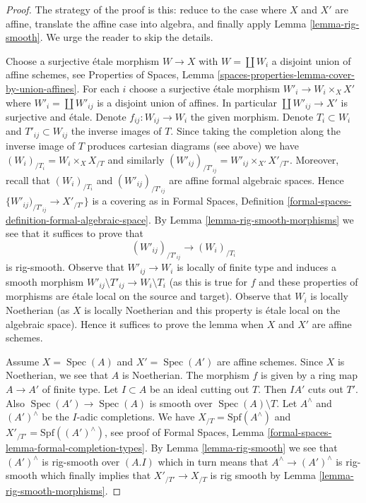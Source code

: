 \documentclass[10pt,a4paper]{amsart}
\theoremstyle{plain}
\theoremstyle{definition}
\theoremstyle{remark}
\numberwithin{equation}{subsection}
\def\Spec{\mathop{\mathrm{Spec}}}
\begin{document}
\begin{proof}
The strategy of the proof is this: reduce to the case where $X$ and $X'$
are affine, translate the affine case into algebra, and finally apply
Lemma \ref{lemma-rig-smooth}. We urge the reader to skip the details.

\medskip\noindent
Choose a surjective \'etale morphism $W \to X$ with $W = \coprod W_i$
a disjoint union of affine schemes, see Properties of Spaces, Lemma
\ref{spaces-properties-lemma-cover-by-union-affines}.
For each $i$ choose a surjective \'etale morphism $W'_i \to W_i \times_X X'$
where $W'_i = \coprod W'_{ij}$ is a disjoint union of affines.
In particular $\coprod W'_{ij} \to X'$ is surjective and \'etale.
Denote $f_{ij} : W_{ij} \to W_i$ the given morphism.
Denote $T_i \subset W_i$ and $T'_{ij} \subset W_{ij}$ the inverse
images of $T$. Since taking the completion along the inverse
image of $T$ produces cartesian diagrams (see above) we
have $(W_i)_{/T_i} = W_i \times_X X_{/T}$ and similarly
$(W'_{ij})_{/T'_{ij}} = W'_{ij} \times_{X'} X'_{/T'}$.
Moreover, recall that $(W_i)_{/T_i}$ and $(W'_{ij})_{/T'_{ij}}$
are affine formal algebraic spaces.
Hence $\{W'_{ij})_{/T'_{ij}} \to X'_{/T'}\}$ is a covering
as in Formal Spaces, Definition
\ref{formal-spaces-definition-formal-algebraic-space}.
By Lemma \ref{lemma-rig-smooth-morphisms}
we see that it suffices to prove that
$$
(W'_{ij})_{/T'_{ij}} \longrightarrow (W_i)_{/T_i}
$$
is rig-smooth. Observe that $W'_{ij} \to W_i$
is locally of finite type and induces a smooth morphism
$W'_{ij} \setminus T'_{ij} \to W_i \setminus T_i$
(as this is true for $f$ and these properties of morphisms are
\'etale local on the source and target).
Observe that $W_i$ is locally Noetherian (as $X$ is locally Noetherian
and this property is \'etale local on the algebraic space).
Hence it suffices to prove the lemma when
$X$ and $X'$ are affine schemes.

\medskip\noindent
Assume $X = \Spec(A)$ and $X' = \Spec(A')$ are affine schemes.
Since $X$ is Noetherian, we see that $A$ is Noetherian.
The morphism $f$ is given by a ring map $A \to A'$ of finite type.
Let $I \subset A$ be an ideal cutting out $T$. Then $IA'$ cuts out $T'$.
Also $\Spec(A') \to \Spec(A)$ is smooth over $\Spec(A) \setminus T$.
Let $A^\wedge$ and $(A')^\wedge$ be the $I$-adic
completions. We have $X_{/T} = \text{Spf}(A^\wedge)$ and
$X'_{/T'} = \text{Spf}((A')^\wedge)$, see proof of
Formal Spaces, Lemma
\ref{formal-spaces-lemma-formal-completion-types}.
By Lemma \ref{lemma-rig-smooth} we see that
$(A')^\wedge$ is rig-smooth over $(A. I)$
which in turn means that $A^\wedge \to (A')^\wedge$ is rig-smooth which
finally implies that $X'_{/T'} \to X_{/T}$ is rig smooth by
Lemma \ref{lemma-rig-smooth-morphisms}.
\end{proof}
\end{document}
